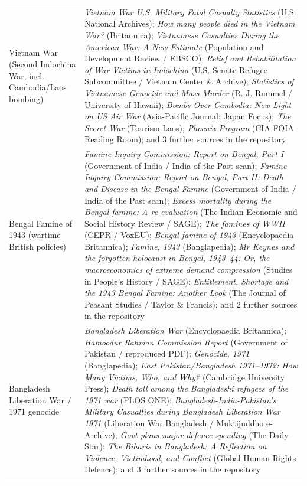 \documentclass[11pt]{article}
\begin{document}
\begin{scriptsize}
\begin{longtable}{p{3.5cm} p{12.5cm}}
Vietnam War (Second Indochina War, incl. Cambodia/Laos bombing) & \emph{Vietnam War U.S. Military Fatal Casualty Statistics} (U.S. National Archives); \emph{How many people died in the Vietnam War?} (Britannica); \emph{Vietnamese Casualties During the American War: A New Estimate} (Population and Development Review / EBSCO); \emph{Relief and Rehabilitation of War Victims in Indochina} (U.S. Senate Refugee Subcommittee / Vietnam Center \& Archive); \emph{Statistics of Vietnamese Genocide and Mass Murder} (R. J. Rummel / University of Hawaii); \emph{Bombs Over Cambodia: New Light on US Air War} (Asia-Pacific Journal: Japan Focus); \emph{The Secret War} (Tourism Laos); \emph{Phoenix Program} (CIA FOIA Reading Room); and 3 further sources in the repository \\
\addlinespace
Bengal Famine of 1943 (wartime British policies) & \emph{Famine Inquiry Commission: Report on Bengal, Part I} (Government of India / India of the Past scan); \emph{Famine Inquiry Commission: Report on Bengal, Part II: Death and Disease in the Bengal Famine} (Government of India / India of the Past scan); \emph{Excess mortality during the Bengal famine: A re-evaluation} (The Indian Economic and Social History Review / SAGE); \emph{The famines of WWII} (CEPR / VoxEU); \emph{Bengal famine of 1943} (Encyclopaedia Britannica); \emph{Famine, 1943} (Banglapedia); \emph{Mr Keynes and the forgotten holocaust in Bengal, 1943–44: Or, the macroeconomics of extreme demand compression} (Studies in People’s History / SAGE); \emph{Entitlement, Shortage and the 1943 Bengal Famine: Another Look} (The Journal of Peasant Studies / Taylor \& Francis); and 2 further sources in the repository \\
\addlinespace
Bangladesh Liberation War / 1971 genocide & \emph{Bangladesh Liberation War} (Encyclopaedia Britannica); \emph{Hamoodur Rahman Commission Report} (Government of Pakistan / reproduced PDF); \emph{Genocide, 1971} (Banglapedia); \emph{East Pakistan/Bangladesh 1971–1972: How Many Victims, Who, and Why?} (Cambridge University Press); \emph{Death toll among the Bangladeshi refugees of the 1971 war} (PLOS ONE); \emph{Bangladesh-India-Pakistan’s Military Casualties during Bangladesh Liberation War 1971} (Liberation War Bangladesh / Muktijuddho e-Archive); \emph{Govt plans major defence spending} (The Daily Star); \emph{The Biharis in Bangladesh: A Reflection on Violence, Victimhood, and Conflict} (Global Human Rights Defence); and 3 further sources in the repository \\
\addlinespace

\end{longtable}
\end{scriptsize}
\end{document}
